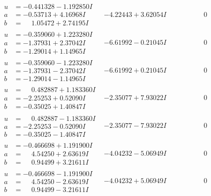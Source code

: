 \documentclass[1p]{elsarticle_modified}
\theoremstyle{definition}
\begin{document}
$$\begin{array}{c|c|c}
\begin{aligned}
u &= -0.441328 - 1.192850 I \\
a &= -0.53713 + 4.16968 I \\
b &= \phantom{-}1.05472 + 2.74195 I\end{aligned}
 & -4.22443 + 3.62054 I & \phantom{-0.000000 } 0 \\ \hline\begin{aligned}
u &= -0.359060 + 1.223280 I \\
a &= -1.37931 + 2.37042 I \\
b &= -1.29014 + 1.14965 I\end{aligned}
 & -6.61992 - 0.21045 I & \phantom{-0.000000 } 0 \\ \hline\begin{aligned}
u &= -0.359060 - 1.223280 I \\
a &= -1.37931 - 2.37042 I \\
b &= -1.29014 - 1.14965 I\end{aligned}
 & -6.61992 + 0.21045 I & \phantom{-0.000000 } 0 \\ \hline\begin{aligned}
u &= \phantom{-}0.482887 + 1.183360 I \\
a &= -2.25253 + 0.52090 I \\
b &= -0.35025 + 1.40847 I\end{aligned}
 & -2.35077 + 7.93022 I & \phantom{-0.000000 } 0 \\ \hline\begin{aligned}
u &= \phantom{-}0.482887 - 1.183360 I \\
a &= -2.25253 - 0.52090 I \\
b &= -0.35025 - 1.40847 I\end{aligned}
 & -2.35077 - 7.93022 I & \phantom{-0.000000 } 0 \\ \hline\begin{aligned}
u &= -0.466698 + 1.191900 I \\
a &= \phantom{-}4.54250 + 2.63619 I \\
b &= \phantom{-}0.94499 + 3.21611 I\end{aligned}
 & -4.04232 - 5.06949 I & \phantom{-0.000000 } 0 \\ \hline\begin{aligned}
u &= -0.466698 - 1.191900 I \\
a &= \phantom{-}4.54250 - 2.63619 I \\
b &= \phantom{-}0.94499 - 3.21611 I\end{aligned}
 & -4.04232 + 5.06949 I & \phantom{-0.000000 } 0\\

\end{array}$$
\end{document}
